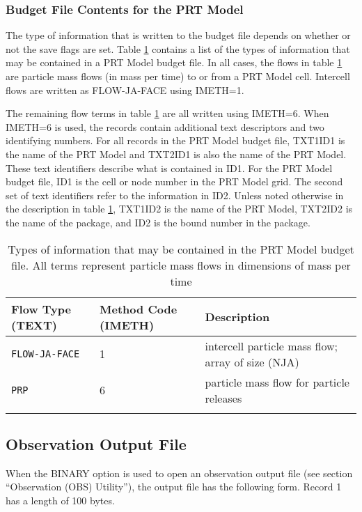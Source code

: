 \newpage
\subsubsection{Budget File Contents for the PRT Model}

The type of information that is written to the budget file depends on whether or not the save flags are set.  Table \ref{table:prtbud} contains a list of the types of information that may be contained in a PRT Model budget file.  In all cases, the flows in table \ref{table:prtbud} are particle mass flows (in mass per time) to or from a PRT Model cell.  Intercell flows are written as FLOW-JA-FACE using IMETH=1.

The remaining flow terms in table \ref{table:prtbud} are all written using IMETH=6.  When IMETH=6 is used, the records contain additional text descriptors and two identifying numbers.  For all records in the PRT Model budget file, TXT1ID1 is the name of the PRT Model and TXT2ID1 is also the name of the PRT Model.  These text identifiers describe what is contained in ID1.  For the PRT Model budget file, ID1 is the cell or node number in the PRT Model grid.  The second set of text identifiers refer to the information in ID2.  Unless noted otherwise in the description in table \ref{table:prtbud}, TXT1ID2 is the name of the PRT Model, TXT2ID2 is the name of the package, and ID2 is the bound number in the package.

\begin{longtable}{p{3.5cm} p{2cm} p{9cm}}
\caption{Types of information that may be contained in the PRT Model budget file.  All terms represent particle mass flows in dimensions of mass per time} 
\tabularnewline
\hline
\textbf{Flow Type (TEXT)} & \textbf{Method Code (IMETH)} & \textbf{Description} \\
\hline
\endhead
\hline
\endfoot
\texttt{FLOW-JA-FACE} & 1 & intercell particle mass flow; array of size (NJA) \\
\texttt{PRP} & 6 & particle mass flow for particle releases \\
\label{table:prtbud}
\end{longtable}


\newpage
\subsection{Observation Output File}

When the BINARY option is used to open an observation output file (see section ``Observation (OBS) Utility''), the output file has the following form. Record 1 has a length of 100 bytes.

